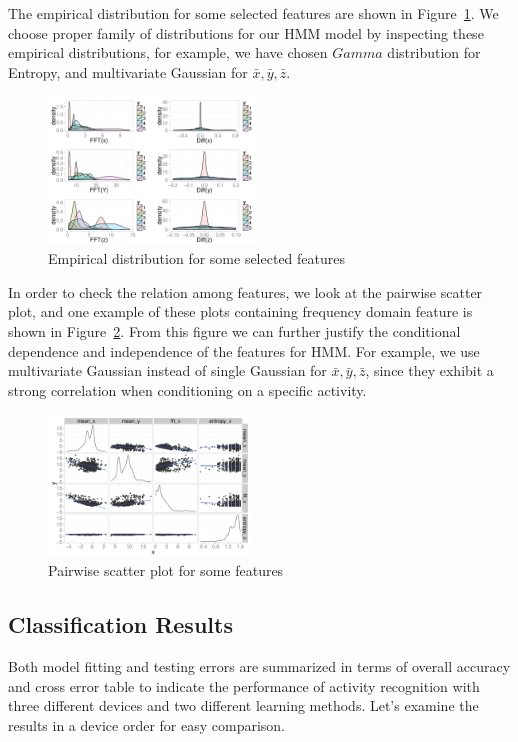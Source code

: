 The empirical distribution for some selected features are shown in Figure~\ref{fig:features}. We choose proper family of distributions for our HMM model by inspecting these empirical distributions, for example, we have chosen $Gamma$ distribution for Entropy, and multivariate Gaussian for $\bar{x},\bar{y},\bar{z}$. 

\begin{figure}
  \centering
  \includegraphics[width=0.5\textwidth]{figures/edafeature22.pdf}
  \caption{Empirical distribution for some selected features}
  \label{fig:features}
\end{figure}

In order to check the relation among features, we look at the pairwise scatter plot, and one example of these plots containing frequency domain feature is shown in Figure~\ref{fig:pairwise}. From this figure we can further justify the conditional dependence and independence of the features for HMM. For example, we use multivariate Gaussian instead of 
single Gaussian for $\bar{x},\bar{y},\bar{z}$, since they exhibit a strong correlation when conditioning on a specific activity.

\begin{figure}
  \centering
  \includegraphics[width=0.48\textwidth]{figures/edafeature1.pdf}
  \caption{Pairwise scatter plot for some features}
  \label{fig:pairwise}
\end{figure}

\subsection{Classification Results}
Both model fitting and testing errors are summarized in terms of overall accuracy and cross error table to indicate the performance of activity recognition with three different devices and two different learning methods. Let's examine the results in a device order for easy comparison.

